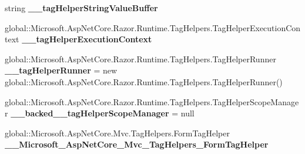 \begin{DoxyCompactItemize}
\item 
\mbox{\label{class_projeto_e_s_w_1_1_areas_1_1_identity_1_1_pages_1_1_account_1_1_areas___identity___pages___account___login_a2c318e120671b7ebc5a6f1ad9662136e}} 
string {\bfseries \+\_\+\+\_\+tag\+Helper\+String\+Value\+Buffer}
\item 
\mbox{\label{class_projeto_e_s_w_1_1_areas_1_1_identity_1_1_pages_1_1_account_1_1_areas___identity___pages___account___login_a49fce52ff3dd0103af41a115a3451bae}} 
global\+::\+Microsoft.\+Asp\+Net\+Core.\+Razor.\+Runtime.\+Tag\+Helpers.\+Tag\+Helper\+Execution\+Context {\bfseries \+\_\+\+\_\+tag\+Helper\+Execution\+Context}
\item 
\mbox{\label{class_projeto_e_s_w_1_1_areas_1_1_identity_1_1_pages_1_1_account_1_1_areas___identity___pages___account___login_abc934fcdc83d2960d337e6e7bb847151}} 
global\+::\+Microsoft.\+Asp\+Net\+Core.\+Razor.\+Runtime.\+Tag\+Helpers.\+Tag\+Helper\+Runner {\bfseries \+\_\+\+\_\+tag\+Helper\+Runner} = new global\+::\+Microsoft.\+Asp\+Net\+Core.\+Razor.\+Runtime.\+Tag\+Helpers.\+Tag\+Helper\+Runner()
\item 
\mbox{\label{class_projeto_e_s_w_1_1_areas_1_1_identity_1_1_pages_1_1_account_1_1_areas___identity___pages___account___login_a6d4af22b349717dccfb07a27e2a37a5b}} 
global\+::\+Microsoft.\+Asp\+Net\+Core.\+Razor.\+Runtime.\+Tag\+Helpers.\+Tag\+Helper\+Scope\+Manager {\bfseries \+\_\+\+\_\+backed\+\_\+\+\_\+tag\+Helper\+Scope\+Manager} = null
\item 
\mbox{\label{class_projeto_e_s_w_1_1_areas_1_1_identity_1_1_pages_1_1_account_1_1_areas___identity___pages___account___login_adb2e59284e7148e066054bad6f4f61ca}} 
global\+::\+Microsoft.\+Asp\+Net\+Core.\+Mvc.\+Tag\+Helpers.\+Form\+Tag\+Helper {\bfseries \+\_\+\+\_\+\+Microsoft\+\_\+\+Asp\+Net\+Core\+\_\+\+Mvc\+\_\+\+Tag\+Helpers\+\_\+\+Form\+Tag\+Helper}

\end{DoxyCompactItemize}
